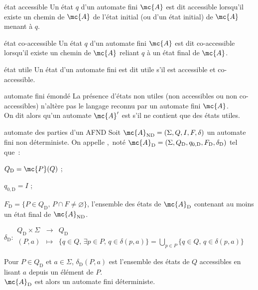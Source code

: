\begin{adjustwidth}{-3cm}{-3cm}
\begin{definition}{2.5}{état accessible}
    Un état $q$ d'un automate fini $\mc{A}$ est dit accessible lorsqu'il existe un chemin de $\mc{A}$ de l'état initial (ou d'un état initial) de $\mc{A}$ menant à $q$.
\end{definition}

\begin{definition}{2.6}{état co-accessible}
    Un état $q$ d'un automate fini $\mc{A}$ est dit co-accessible lorsqu'il existe un chemin de $\mc{A}$ reliant $q$ à un état final de $\mc{A}$.
\end{definition}

\begin{definition}{2.7}{état utile}
    Un état d'un automate fini est dit utile s'il est accessible et co-accessible.
\end{definition}

\begin{definition}{2.8}{automate fini émondé}
    La présence d'états non utiles (non accessibles ou non co-accessibles) n'altère pas le langage reconnu par un automate fini $\mc{A}$. \\
    On dit alors qu'un automate $\mc{A}'$ est  s'il ne contient que des états utiles.
\end{definition}

\begin{definition}{2.9}{automate des parties d'un AFND}
    Soit $\mc{A}_{\text{ND}} = (\Sigma, Q, I, F, \delta)$ un automate fini non déterministe. On appelle ,\, noté $\mc{A}_{\text{D}} = (\Sigma, Q_{\text{D}}, q_{0,\text{D}}, F_{\text{D}}, \delta_{\text{D}})$ tel que~:
    \begin{enumeratebf}
        \item $Q_{\text{D}} = \mc{P}(Q)$ ;
        \item $q_{0,\text{D}} = I$ ;
        \item $F_{\text{D}} = \{P \in Q_{\text{D}},\, P\cap F \neq \varnothing\}$, l'ensemble des états de $\mc{A}_{\text{D}}$ contenant au moins un état final de $\mc{A}_{\text{ND}}$.
        \item $ \displaystyle \delta_{\text{D}} : \begin{array}{rcl}
            Q_{\text{D}} \times \Sigma &  \to & Q_{\text{D}} \\
            (P,a) & \mapsto & \{q \in Q,\, \exists p \in P,\, q \in \delta(p,a)\} = \bigcup_{p \in P} \{q\in Q,\, q \in \delta(p,a)\}
            \end{array}$
    \end{enumeratebf}
    Pour $P \in Q_{\text{D}}$ et $a \in \Sigma$, $\delta_{\text{D}}(P,a)$ est l'ensemble des états de $Q$ accessibles en lisant $a$ depuis un élément de $P$.\\
    $\mc{A}_{\text{D}}$ est alors un automate fini déterministe.


\end{definition}
\end{adjustwidth}
